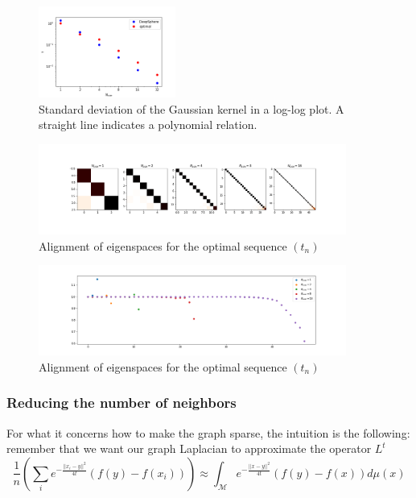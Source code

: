 \begin{figure}[h]
	\label{fig:t}
	\caption{Standard deviation of the Gaussian kernel  in a log-log plot. A straight line indicates a polynomial relation.}
	\centering
	\includegraphics[width=0.4\textwidth]{../codes/02.HeatKernelGraphLaplacian/HEALPix/06_figures/kernelwidth.png}
\end{figure}

\begin{figure}[h]
	\label{fig:optimal graph}
	\caption{Alignment of eigenspaces for the optimal sequence $(t_n)$}
	\centering
	\includegraphics[width=0.9\textwidth]{../codes/02.HeatKernelGraphLaplacian/HEALPix/06_figures/optimal_full.png}	
\end{figure}
\begin{figure}[h]
	\label{fig:optimal graph diagonal}
	\caption{Alignment of eigenspaces for the optimal sequence $(t_n)$}
	\centering
	\includegraphics[width=0.9\textwidth]{../codes/02.HeatKernelGraphLaplacian/HEALPix/06_figures/optimal_full_diagonal.png}	
\end{figure}

\subsubsection{Reducing the number of neighbors}
For what it concerns how to make the graph sparse, the intuition is the following: remember that we want our graph Laplacian to approximate the operator $L^t$
$$\frac{1}{n}\left(\sum_i e^{-\frac{||x_i-y||^2}{4t}}(f(y)-f(x_i)) \right) \approx \int_\mathcal M e^{-\frac{||x-y||^2}{4t}}\left(f(y)-f(x)\right)d\mu(x) $$

